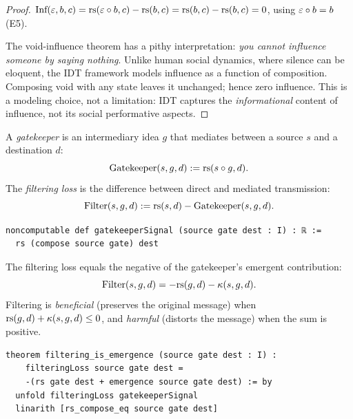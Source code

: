 \begin{proof}
$\text{Inf}(\varepsilon, b, c) = \mathrm{rs}(\varepsilon \circ b, c) - \mathrm{rs}(b, c) = \mathrm{rs}(b, c)
- \mathrm{rs}(b, c) = 0$, using $\varepsilon \circ b = b$ (E5).

The void-influence theorem has a pithy interpretation: \emph{you cannot
influence someone by saying nothing}.  Unlike human social dynamics, where
silence can be eloquent, the IDT framework models influence as a function
of composition.  Composing void with any state leaves it unchanged; hence
zero influence.  This is a modeling choice, not a limitation: IDT captures
the \emph{informational} content of influence, not its social performative
aspects.
\end{proof}

\begin{definition}
\label{def:gatekeeping}
A \emph{gatekeeper} is an intermediary idea $g$ that mediates between a
source $s$ and a destination $d$:
\[
  \text{Gatekeeper}(s, g, d) := \mathrm{rs}(s \circ g, d).
\]
The \emph{filtering loss} is the difference between direct and mediated
transmission:
\[
  \text{Filter}(s, g, d) := \mathrm{rs}(s, d) - \text{Gatekeeper}(s, g, d).
\]

\begin{lstlisting}[caption={Lean 4: Gatekeeper signal}]
noncomputable def gatekeeperSignal (source gate dest : I) : ℝ :=
  rs (compose source gate) dest
\end{lstlisting}
\end{definition}

\begin{theorem}
\label{thm:filtering-emergence}
The filtering loss equals the negative of the gatekeeper's emergent
contribution:
\[
  \text{Filter}(s, g, d) = -\mathrm{rs}(g, d) - \kappa(s, g, d).
\]
Filtering is \emph{beneficial} (preserves the original message) when
$\mathrm{rs}(g, d) + \kappa(s, g, d) \leq 0$, and \emph{harmful} (distorts the
message) when the sum is positive.

\begin{lstlisting}[caption={Lean 4: Filtering is emergence}]
theorem filtering_is_emergence (source gate dest : I) :
    filteringLoss source gate dest =
    -(rs gate dest + emergence source gate dest) := by
  unfold filteringLoss gatekeeperSignal
  linarith [rs_compose_eq source gate dest]
\end{lstlisting}
\end{theorem}

